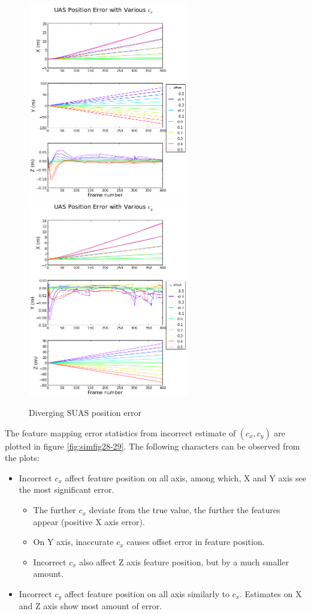 \begin{figure}[h]
  \centering
  \includegraphics[width=7cm,keepaspectratio=true]{./Figures/SimulationFigures/Figure36.png}
  \includegraphics[width=7cm,keepaspectratio=true]{./Figures/SimulationFigures/Figure37.png}
  \caption{Diverging SUAS position error}
  \label{fig:simfig36-37}
\end{figure}
\FloatBarrier

The feature mapping error statistics from incorrect estimate of $
(c_{x}, c_{y})$ are plotted in figure \ref{fig:simfig28-29}. The
following characters can be observed from the plots:

\begin{itemize}
  \item Incorrect $c_{x}$ affect feature position on all axis, among
  which, X and Y axis see the most significant error.
  \begin{itemize}
    \item The further $c_{x}$ deviate from the true value, the further
    the features appear (positive X axis error).
    \item On Y axis, inaccurate $c_x$ causes offset error in feature
    position. 
    \item Incorrect $c_{x}$ also affect Z axis feature position, but
    by a much smaller amount.
  \end{itemize}
  \item Incorrect $c_{y}$ affect feature position on all axis
  similarly to $c_{x}$. Estimates on X and Z axis show most amount of
  error.
\end{itemize}

